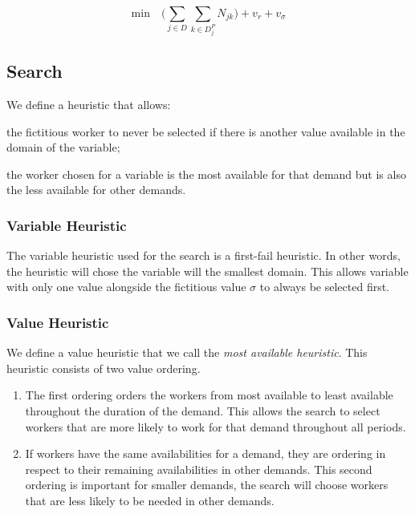 \documentclass[../../thesis.tex]{subfiles}
\begin{document}
\begin{equation}
  \text{min} \quad \big( \sum_{j \in D} \sum_{k \in D^P_j} N_{jk} \big) + v_r + v_{\sigma} \label{cp:objective}
\end{equation}


\subsection{Search}

We define a heuristic that allows:
\begin{enumerate*}[label=(\roman*)]
  \item the fictitious worker to never be selected if there is another value available in the domain of the variable;
  \item the worker chosen for a variable is the most available for that demand but is also the less available for other demands.
\end{enumerate*}

\subsubsection{Variable Heuristic}

The variable heuristic used for the search is a first-fail heuristic. In other words, the heuristic 
will chose the variable will the smallest domain. This allows variable with only one value alongside the 
fictitious value $\sigma$ to always be selected first.

\subsubsection{Value Heuristic}

We define a value heuristic that we call the \emph{most available heuristic}. 
This heuristic consists of two value ordering.
\begin{enumerate}
  \item The first ordering orders the workers from most available to least available throughout the duration of the demand.
        This allows the search to select workers that are more likely to work for that demand throughout all periods.
  \item If workers have the same availabilities for a demand, they are ordering in respect to their remaining availabilities in other demands. This 
        second ordering is important for smaller demands, the search will choose workers that are less likely to be needed in other demands.
\end{enumerate}
\end{document}
